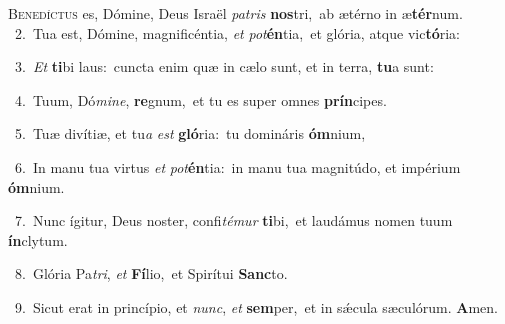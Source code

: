 \lettrine{\initial\textcolor{\initialcolor}{B}}{enedíctus} es, Dómine, Deus Israël \textit{pa}\-\textit{tris} \textbf{nos}\-tri,~\star ab ætérno in æ\-\textbf{tér}\-num.\\
{\numbfont\textcolor{\numbcolor}{~2.}}~Tua est, Dómine, magnificéntia, \textit{et} \textit{pot}\-\textbf{én}tia,~\star et glória, atque vic\-\textbf{tó}\-ria:\par
{\numbfont\textcolor{\numbcolor}{~3.}}~\textit{Et} \textbf{ti}\-bi laus:~\star cuncta enim quæ in cælo sunt, et in terra, \textbf{tu}\-a sunt:\par
{\numbfont\textcolor{\numbcolor}{~4.}}~Tuum, Dó\-\textit{mi}\-\textit{ne}, \textbf{re}\-gnum,~\star et tu es super omnes \textbf{prín}\-cipes.\par
{\numbfont\textcolor{\numbcolor}{~5.}}~Tuæ divítiæ, et tu\textit{a} \textit{est} \textbf{gló}\-ria:~\star tu domináris \textbf{óm}\-nium,\par
{\numbfont\textcolor{\numbcolor}{~6.}}~In manu tua virtus \textit{et} \textit{pot}\-\textbf{én}tia:~\star in manu tua magnitúdo, et impérium \textbf{óm}\-nium.\par
{\numbfont\textcolor{\numbcolor}{~7.}}~Nunc ígitur, Deus noster, confi\-\textit{té}\-\textit{mur} \textbf{ti}\-bi,~\star et laudámus nomen tuum \textbf{ín}\-clytum.\par
{\numbfont\textcolor{\numbcolor}{~8.}}~Glória Pa\-\textit{tri}\-, \textit{et} \textbf{Fí}\-lio,~\star et Spirítui \textbf{Sanc}\-to.\par
{\numbfont\textcolor{\numbcolor}{~9.}}~Sicut erat in princípio, et \textit{nunc}\-, \textit{et} \textbf{sem}\-per,~\star et in sǽcula sæculórum. \textbf{A}\-men.\par

